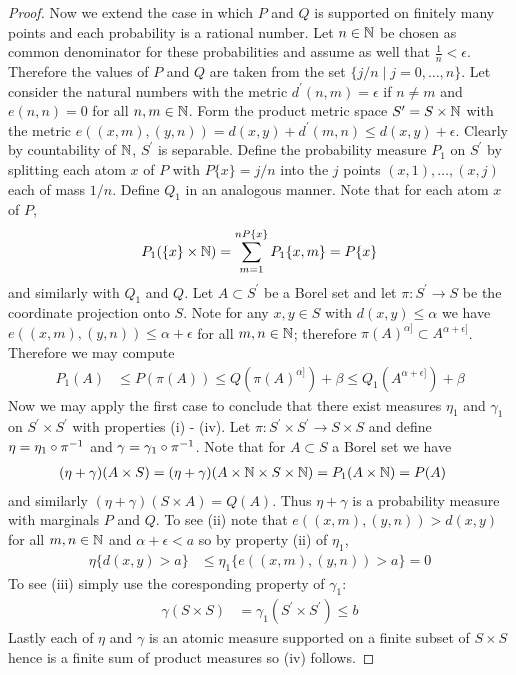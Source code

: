 \begin{proof}
Now we extend the case in which $P$ and $Q$ is supported on finitely many points and each probability is a rational number.  Let $n \in \mathbb{N}$ be chosen as common denominator for these probabilities and assume as well that $\frac{1}{n} < \epsilon$.  Therefore the values of $P$ and $Q$ are taken from the set $\lbrace j/n \mid j=0, \dotsc, n \rbrace$.  Let consider the natural numbers with the metric $d^\prime(n,m) = \epsilon$ if $n\neq m$ and $e(n,n) = 0$ for all $n,m \in \mathbb{N}$.  Form the product metric space $S^\prime = S \times \mathbb{N}$ with the metric $e((x,m), (y,n)) = d(x,y) + d^\prime(m,n) \leq d(x,y) + \epsilon$.  Clearly by countability of $\mathbb{N}$, $S^\prime$ is separable.  Define the probability measure $P_1$ on $S^\prime$ by splitting each atom $x$ of $P$ with $P\lbrace x \rbrace = j/n$ into the $j$ points $(x,1), \dotsc, (x,j)$ each of mass $1/n$.  Define $Q_1$ in an analogous manner.  Note that for each atom $x$ of $P$,
\begin{align*}
P_1(\lbrace x \rbrace \times \mathbb{N})  = \sum_{m=1}^{nP \lbrace x \rbrace} P_1 \lbrace x, m \rbrace = P \lbrace x \rbrace
\end{align*}
and similarly with $Q_1$ and $Q$.  Let $A \subset S^\prime$ be a Borel set and let $\pi : S^\prime \to S$ be the coordinate projection onto $S$.  Note for any $x, y \in S$ with $d(x,y) \leq \alpha$ we have $e((x,m), (y,n)) \leq \alpha + \epsilon$ for all $m,n \in \mathbb{N}$; therefore $\pi(A)^{\alpha]} \subset A^{\alpha + \epsilon]}$.  Therefore we may compute
\begin{align*}
P_1 (A) &\leq P( \pi (A)) \leq Q( \pi(A)^{\alpha]}) + \beta \leq Q_1 (A^{\alpha + \epsilon]}) + \beta
\end{align*}
Now we may apply the first case to conclude that there exist measures $\eta_1$ and $\gamma_1$  on $S^\prime \times S^\prime$ with properties (i) - (iv).  Let $\pi : S^\prime \times S^\prime \to S \times S$ and define $\eta = \eta_1 \circ \pi^{-1}$ and $\gamma=\gamma_1 \circ \pi^{-1}$.  Note that for $A \subset S$ a Borel set we have
\begin{align*}
(\eta + \gamma)(A \times S) &= (\eta + \gamma)(A \times \mathbb{N} \times S \times \mathbb{N}) = P_1 (A \times \mathbb{N}) = P(A)
\end{align*}
and similarly $(\eta + \gamma)(S \times A) = Q(A)$.  Thus $\eta + \gamma$ is a probability measure with marginals $P$ and $Q$.  To see (ii) note that $e((x,m), (y,n)) > d(x,y)$ for all $m,n \in \mathbb{N}$ and $\alpha + \epsilon < a$ so by property (ii) of $\eta_1$,
\begin{align*}
\eta \lbrace d(x,y) > a \rbrace &\leq \eta_1 \lbrace e((x,m), (y,n)) > a \rbrace = 0
\end{align*}
To see (iii) simply use the coresponding property of $\gamma_1$:
\begin{align*}
\gamma (S \times S) &= \gamma_1(S^\prime \times S^\prime) \leq b
\end{align*}
Lastly each of $\eta$ and $\gamma$ is an atomic measure supported on a finite subset of $S \times S$ hence is a finite sum of product measures so (iv) follows.


\end{proof}
